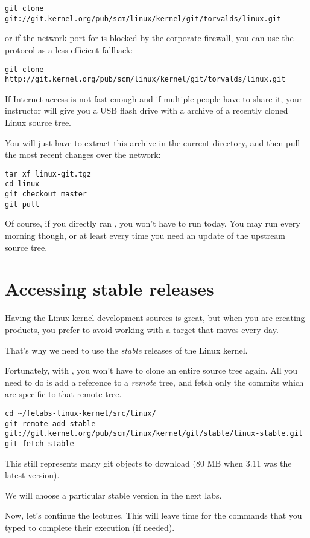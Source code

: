 {\small
\begin{verbatim}
git clone git://git.kernel.org/pub/scm/linux/kernel/git/torvalds/linux.git
\end{verbatim}
}

or if the network port for  is blocked by the corporate
firewall, you can use the  protocol as a less efficient
fallback:

{\small
\begin{verbatim}
git clone http://git.kernel.org/pub/scm/linux/kernel/git/torvalds/linux.git
\end{verbatim}
}

If Internet access is not fast enough and if multiple people have to
share it, your instructor will give you a USB flash drive with a
 archive of a recently cloned Linux source tree.

You will just have to extract this archive in the current directory,
and then pull the most recent changes over the network:

\begin{verbatim}
tar xf linux-git.tgz
cd linux
git checkout master
git pull
\end{verbatim}

Of course, if you directly ran , you won't have to run
 today. You may run  every morning though,
or at least every time you need an update of the upstream source tree.

\section{Accessing stable releases}

Having the Linux kernel development sources is great, but when you are
creating products, you prefer to avoid working with a target that moves
every day.

That's why we need to use the {\em stable} releases of the Linux
kernel.

Fortunately, with , you won't have to clone an entire source
tree again. All you need to do is add a reference to a {\em remote}
tree, and fetch only the commits which are specific to that remote tree.

{\footnotesize
\begin{verbatim}
cd ~/felabs-linux-kernel/src/linux/
git remote add stable git://git.kernel.org/pub/scm/linux/kernel/git/stable/linux-stable.git
git fetch stable
\end{verbatim}
}

This still represents many git objects to download (80 MB when 3.11 was
the latest version).

We will choose a particular stable version in the next labs.

Now, let's continue the lectures. This will leave time for the commands
that you typed to complete their execution (if needed).
